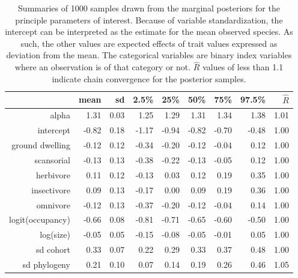 \begin{table}[ht]
  \centering
  \caption{Summaries of 1000 samples drawn from the marginal posteriors for the principle parameters of interest. Because of variable standardization, the intercept can be interpreted as the estimate for the mean observed species. As such, the other values are expected effects of trait values expressed as deviation from the mean. The categorical variables are binary index variables where an observation is of that category or not. \(\hat{R}\) values of less than 1.1 indicate chain convergence for the posterior samples.}
  \begin{tabular}{rrrrrrrrr}
    \hline
    & mean & sd & 2.5\% & 25\% & 50\% & 75\% & 97.5\% & \(\hat{R}\) \\ 
    \hline
    \hline
    alpha & 1.31 & 0.03 & 1.25 & 1.29 & 1.31 & 1.34 & 1.38 & 1.01 \\ 
    \hline
    intercept & -0.82 & 0.18 & -1.17 & -0.94 & -0.82 & -0.70 & -0.48 & 1.00 \\ 
    ground dwelling & -0.12 & 0.12 & -0.34 & -0.20 & -0.12 & -0.04 & 0.12 & 1.00 \\ 
    scansorial & -0.13 & 0.13 & -0.38 & -0.22 & -0.13 & -0.05 & 0.12 & 1.00 \\ 
    herbivore & 0.11 & 0.12 & -0.13 & 0.03 & 0.12 & 0.19 & 0.35 & 1.00 \\ 
    insectivore & 0.09 & 0.13 & -0.17 & 0.00 & 0.09 & 0.19 & 0.36 & 1.00 \\ 
    omnivore & -0.12 & 0.13 & -0.37 & -0.20 & -0.12 & -0.04 & 0.14 & 1.00 \\ 
    logit(occupancy) & -0.66 & 0.08 & -0.81 & -0.71 & -0.65 & -0.60 & -0.50 & 1.00 \\ 
    log(size) & -0.05 & 0.05 & -0.15 & -0.08 & -0.05 & -0.01 & 0.05 & 1.00 \\ 
    \hline
    sd cohort & 0.33 & 0.07 & 0.22 & 0.29 & 0.33 & 0.37 & 0.48 & 1.00 \\ 
    sd phylogeny & 0.21 & 0.10 & 0.07 & 0.14 & 0.19 & 0.26 & 0.46 & 1.05 \\ 
    \hline
  \end{tabular}
  \label{tab:post_sum}
\end{table}
